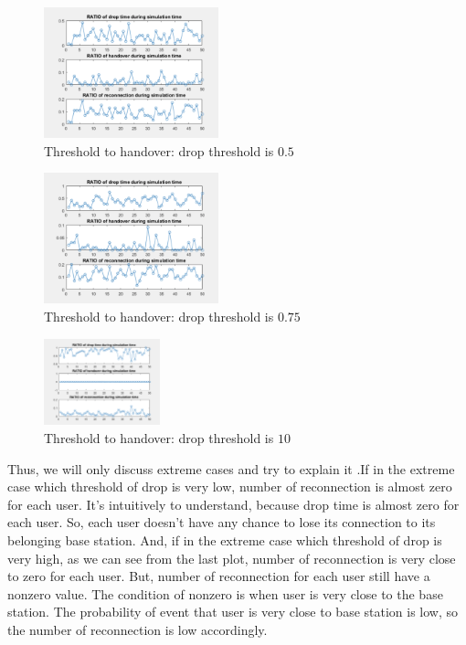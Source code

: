 \documentclass[a4paper]{IEEEtran}
\begin{document}
\begin{figure}[h]
    \includegraphics[width=0.45\textwidth]{exp1/3}
    \caption{Threshold to handover: drop threshold is $0.5$}
    \label{fig:mesh14}
\end{figure}
\begin{figure}[h]
    \includegraphics[width=0.45\textwidth]{exp1/4}
    \caption{Threshold to handover: drop threshold is $0.75$}
    \label{fig:mesh15}
\end{figure}
\begin{figure}[h]
    \includegraphics[width=0.3\textwidth]{exp1/5}
    \caption{Threshold to handover: drop threshold is $10$}
    \label{fig:mesh16}
\end{figure}
Thus, we will only discuss extreme cases and try to explain it .If in the extreme case which threshold of drop is very low, number of reconnection is almost zero for each user. It’s intuitively to understand, because drop time is almost zero for each user. So, each user doesn’t have any chance to lose its connection to its belonging base station. And, if in the extreme case which threshold of drop is very high, as we can see from the last plot, number of reconnection is very close to zero for each user. But, number of reconnection for each user still have a nonzero value. The condition of nonzero is when user is very close to the base station. The probability of event that user is very close to base station is low, so the number of reconnection is low accordingly.
\end{document}
